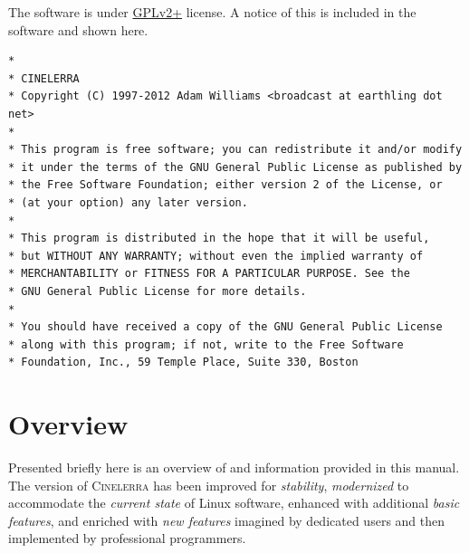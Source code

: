 The \CGG{} software is under
\href{https://www.gnu.org/licenses/old-licenses/gpl-2.0-standalone.html}{GPLv2+}
license. A notice of this is included in the software and shown here.

\begin{lstlisting}[basicstyle=\footnotesize]
*
* CINELERRA
* Copyright (C) 1997-2012 Adam Williams <broadcast at earthling dot net>
*
* This program is free software; you can redistribute it and/or modify
* it under the terms of the GNU General Public License as published by
* the Free Software Foundation; either version 2 of the License, or
* (at your option) any later version.
*
* This program is distributed in the hope that it will be useful,
* but WITHOUT ANY WARRANTY; without even the implied warranty of
* MERCHANTABILITY or FITNESS FOR A PARTICULAR PURPOSE. See the
* GNU General Public License for more details.
*
* You should have received a copy of the GNU General Public License
* along with this program; if not, write to the Free Software
* Foundation, Inc., 59 Temple Place, Suite 330, Boston
\end{lstlisting}

\section*{\CGG{} Overview}%
\label{sec:cinelerra_overview}

Presented briefly here is an overview of \CGGI{} and information
provided in this manual. The \GG{} version of \textsc{Cinelerra} has
been improved for \emph{stability}, \emph{modernized} to accommodate
the \emph{current state} of Linux software, enhanced with additional
\emph{basic features}, and enriched with \emph{new features}
imagined by dedicated users and then implemented by professional
programmers.

